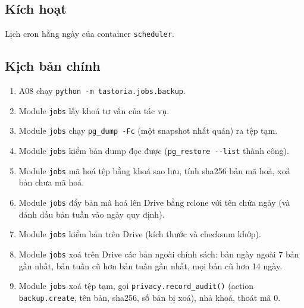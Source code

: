 \subsection{Kích hoạt}
Lịch cron hằng ngày của container {\small\texttt{scheduler}}.

\subsection{Kịch bản chính}
\begin{enumerate}
\item A08 chạy {\small\texttt{python -\allowbreak{}m tastoria.\allowbreak{}jobs.\allowbreak{}backup}}.
\item Module {\small\texttt{jobs}} lấy khoá tư vấn của tác vụ.
\item Module {\small\texttt{jobs}} chạy {\small\texttt{pg\_\allowbreak{}\allowbreak{}dump -\allowbreak{}Fc}} (một snapshot nhất quán) ra tệp tạm.
\item Module {\small\texttt{jobs}} kiểm bản dump đọc được ({\small\texttt{pg\_\allowbreak{}\allowbreak{}restore -\allowbreak{}-\allowbreak{}list}} thành công).
\item Module {\small\texttt{jobs}} mã hoá tệp bằng khoá sao lưu, tính sha256 bản mã hoá, xoá bản chưa mã hoá.
\item Module {\small\texttt{jobs}} đẩy bản mã hoá lên Drive bằng rclone với tên chứa ngày (và đánh dấu bản tuần vào ngày quy định).
\item Module {\small\texttt{jobs}} kiểm bản trên Drive (kích thước và checksum khớp).
\item Module {\small\texttt{jobs}} xoá trên Drive các bản ngoài chính sách: bản ngày ngoài 7 bản gần nhất, bản tuần cũ hơn bản tuần gần nhất, mọi bản cũ hơn 14 ngày.
\item Module {\small\texttt{jobs}} xoá tệp tạm, gọi {\small\texttt{privacy.\allowbreak{}record\_\allowbreak{}\allowbreak{}audit()}} (action {\small\texttt{backup.\allowbreak{}create}}, tên bản, sha256, số bản bị xoá), nhả khoá, thoát mã 0.
\end{enumerate}
